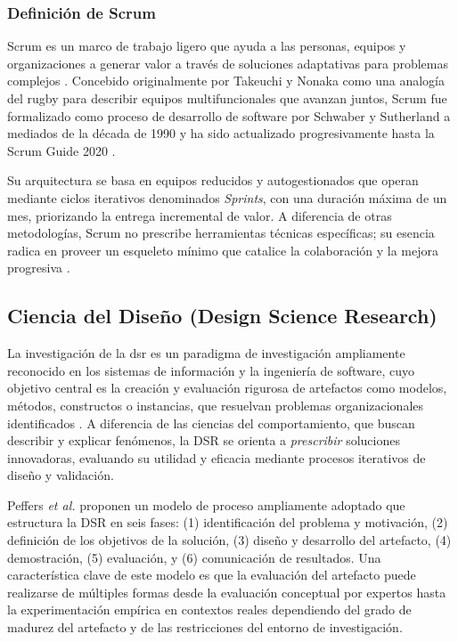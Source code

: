 \subsubsection{Definición de Scrum}
Scrum es un marco de trabajo ligero que ayuda a las personas, equipos y organizaciones a generar valor a través de soluciones adaptativas para problemas complejos \cite{schwaber2020scrum}. Concebido originalmente por Takeuchi y Nonaka \cite{takeuchi1986new} como una analogía del rugby para describir equipos multifuncionales que avanzan juntos, Scrum fue formalizado como proceso de desarrollo de software por Schwaber y Sutherland a mediados de la década de 1990 y ha sido actualizado progresivamente hasta la Scrum Guide 2020 \cite{schwaber2020scrum}.

Su arquitectura se basa en equipos reducidos y autogestionados que operan mediante ciclos iterativos denominados \textit{Sprints}, con una duración máxima de un mes, priorizando la entrega incremental de valor. A diferencia de otras metodologías, Scrum no prescribe herramientas técnicas específicas; su esencia radica en proveer un esqueleto mínimo que catalice la colaboración y la mejora progresiva \cite{takeuchi1986new}.

\subsection{Ciencia del Diseño (Design Science Research)}
\label{sec:dsr}

La investigación de la \gls{dsr} es un paradigma de investigación ampliamente reconocido en los sistemas de información y la ingeniería de software, cuyo objetivo central es la creación y evaluación rigurosa de artefactos como modelos, métodos, constructos o instancias, que resuelvan problemas organizacionales identificados \cite{hevner2004designscience}. A diferencia de las ciencias del comportamiento, que buscan describir y explicar fenómenos, la DSR se orienta a \textit{prescribir} soluciones innovadoras, evaluando su utilidad y eficacia mediante procesos iterativos de diseño y validación.

Peffers \textit{et al.} \cite{peffers2007dsrm} proponen un modelo de proceso ampliamente adoptado que estructura la DSR en seis fases: (1) identificación del problema y motivación, (2) definición de los objetivos de la solución, (3) diseño y desarrollo del artefacto, (4) demostración, (5) evaluación, y (6) comunicación de resultados. Una característica clave de este modelo es que la evaluación del artefacto puede realizarse de múltiples formas desde la evaluación conceptual por expertos hasta la experimentación empírica en contextos reales dependiendo del grado de madurez del artefacto y de las restricciones del entorno de investigación.

